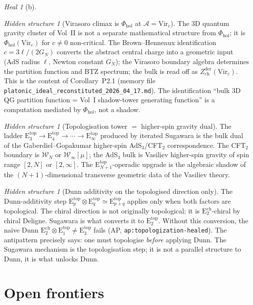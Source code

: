\documentclass{article}
\theoremstyle{definition}
\theoremstyle{remark}
\newtheorem{heal}[theorem]{Heal}
\newtheorem{hidden}[theorem]{Hidden structure}
\newcommand{\Phihol}{\Phi_{\mathrm{hol}}}
\newcommand{\Zder}{Z^{\mathrm{der}}_{\mathrm{ch}}}
\newcommand{\Etop}[1]{\mathrm{E}_{#1}^{\mathrm{top}}}
\newcommand{\Ech}[1]{\mathrm{E}_{#1}^{\mathrm{ch}}}
\newcommand{\Vir}{\mathrm{Vir}}
\newcommand{\cW}{\mathcal{W}}
\newcommand{\cA}{\mathcal{A}}
\begin{document}
\begin{heal}[b]
\begin{hidden}[Virasoro climax is $\Phihol$ at $\cA = \Vir_c$]
\label{hidden:virasoro-climax}
The 3D quantum gravity cluster of Vol~II is not a
separate mathematical structure from $\Phihol$; it is
$\Phihol(\Vir_c)$ for $c \neq 0$ non-critical. The
Brown--Henneaux identification $c = 3\ell/(2G_N)$ converts
the abstract central charge into a geometric input (AdS
radius $\ell$, Newton constant $G_N$); the Virasoro boundary
algebra determines the partition function and BTZ spectrum;
the bulk is read off as $\Zder(\Vir_c)$. This is the
content of Corollary~P2.1 (memory file
\texttt{platonic\_ideal\_reconstituted\_2026\_04\_17.md}).
The identification ``bulk 3D QG partition function = Vol~I
shadow-tower generating function'' is a computation
mediated by $\Phihol$, not a shadow.
\end{hidden}

\begin{hidden}[Topologisation tower $=$ higher-spin gravity
dual]
\label{hidden:topo-tower-higher-spin}
The ladder
$\Etop{3} \to \Etop{4} \to \cdots \to \Etop{\infty}$
produced by iterated Sugawara is the bulk dual of the
Gaberdiel--Gopakumar higher-spin AdS$_3$/CFT$_2$
correspondence. The CFT$_2$ boundary is $\cW_N$ or
$\cW_\infty[\mu]$; the AdS$_3$ bulk is Vasiliev higher-spin
gravity of spin range $[2, N]$ or $[2, \infty]$. The
$\Etop{N+1}$-operadic upgrade is the algebraic shadow of
the $(N+1)$-dimensional transverse geometric data of the
Vasiliev theory.
\end{hidden}

\begin{hidden}[Dunn additivity on the topologised direction
only]
\label{hidden:dunn-topologised}
The Dunn-additivity step
$\Etop{p} \otimes \Etop{q} \simeq \Etop{p+q}$ applies only
when both factors are topological. The chiral direction is
not originally topological; it is $\Ech{2}$-chiral by
chiral Deligne. Sugawara is what converts it to
$\Etop{2}$. Without this conversion, the naive Dunn
$\Ech{2} \otimes \Etop{1} \ne \Etop{3}$ fails (AP,
\texttt{ap:topologization-healed}). The antipattern
precisely says: one must topologise \emph{before} applying
Dunn. The Sugawara mechanism is the topologisation step; it
is not a parallel structure to Dunn, it is what unlocks Dunn.
\end{hidden}

\section{Open frontiers}
\label{sec:opus-open}


\end{heal}
\end{document}
